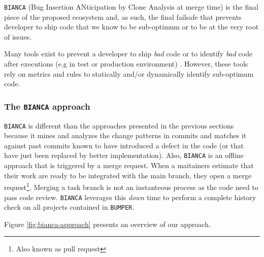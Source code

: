 

{\tt BIANCA} (Bug Insertion ANticipation by Clone Analysis at merge time) is the final piece of the proposed ecosystem and, as such, the final failsafe that prevents developer to ship code that we know to be sub-optimum or to be at the very root of issues.

Many tools exist to prevent a developer to ship {\it bad} code \cite{Dangel2000,Hovemeyer2007,Moha2010} or to identify {\it bad} code after executions (e.g in test or production environment) \cite{Nayrolles,Nayrolles2013a}.
However, these tools rely on metrics and rules to statically and/or dynamically identify sub-optimum code.

\subsubsection{The {\tt BIANCA} approach\label{sec:bianca-approach}}

{\tt BIANCA} is different than the approaches presented in the previous sections  because it mines and analyzes the change patterns in commits and matches it against past commits known to have introduced a defect in the code (or that have just been replaced by better implementation).
Also, {\tt BIANCA} is an offline approach that is triggered by a merge request.
When a maitainers estimate that their work are ready to be integrated with the main branch, they open a merge request\footnote{Also known as pull request}.
Merging a task branch is not an instanteous process as the code need to pass code review.
{\tt BIANCA} leverages this {\it down} time to perform a complete history check on all projects contained in {\tt BUMPER}.

Figure \ref{fig:bianca-approach} presents an overview of our approach.

